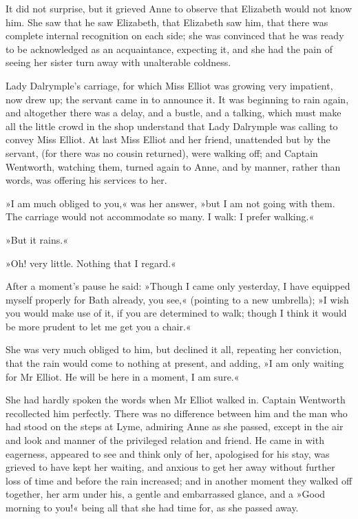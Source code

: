 It did not surprise, but it grieved Anne to observe that Elizabeth would not know him. She saw that he saw Elizabeth, that Elizabeth saw him, that there was complete internal recognition on each side; she was convinced that he was ready to be acknowledged as an acquaintance, expecting it, and she had the pain of seeing her sister turn away with unalterable coldness.

Lady Dalrymple's carriage, for which Miss Elliot was growing very impatient, now drew up; the servant came in to announce it. It was beginning to rain again, and altogether there was a delay, and a bustle, and a talking, which must make all the little crowd in the shop understand that Lady Dalrymple was calling to convey Miss Elliot. At last Miss Elliot and her friend, unattended but by the servant, (for there was no cousin returned), were walking off; and Captain Wentworth, watching them, turned again to Anne, and by manner, rather than words, was offering his services to her.

»I am much obliged to you,« was her answer, »but I am not going with them. The carriage would not accommodate so many. I walk: I prefer walking.«

»But it rains.«

»Oh! very little. Nothing that I regard.«

After a moment's pause he said: »Though I came only yesterday, I have equipped myself properly for Bath already, you see,« (pointing to a new umbrella); »I wish you would make use of it, if you are determined to walk; though I think it would be more prudent to let me get you a chair.«

She was very much obliged to him, but declined it all, repeating her conviction, that the rain would come to nothing at present, and adding, »I am only waiting for Mr Elliot. He will be here in a moment, I am sure.«

She had hardly spoken the words when Mr Elliot walked in. Captain Wentworth recollected him perfectly. There was no difference between him and the man who had stood on the steps at Lyme, admiring Anne as she passed, except in the air and look and manner of the privileged relation and friend. He came in with eagerness, appeared to see and think only of her, apologised for his stay, was grieved to have kept her waiting, and anxious to get her away without further loss of time and before the rain increased; and in another moment they walked off together, her arm under his, a gentle and embarrassed glance, and a »Good morning to you!« being all that she had time for, as she passed away.

